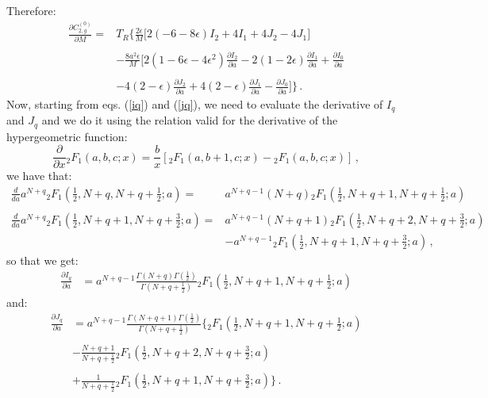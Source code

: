 \documentclass[10pt,a4paper]{article}
\begin{document}
Therefore:
\begin{equation}
\begin{array}{rl}
\displaystyle \frac{\partial C_{2,g}^{(0)}}{\partial M}=&\displaystyle T_R\Bigg\{\frac{2\epsilon}M\Big[2(-6-8\epsilon)I_2+4I_1+4J_2-4J_1\Big]\\
\\
&\displaystyle -\frac{8a^2\epsilon}{M}\Bigg[2(1-6\epsilon-4\epsilon^2)\frac{\partial I_2}{\partial a}-2(1-2\epsilon)\frac{\partial I_1}{\partial a}+\frac{\partial I_0}{\partial a}\\
\\
& \displaystyle -4(2-\epsilon)\frac{\partial J_2}{\partial a}+4(2-\epsilon)\frac{\partial J_1}{\partial a}-\frac{\partial J_0}{\partial a}\Bigg]\Bigg\}\,.
\end{array}
\end{equation}
Now, starting from eqs. (\ref{iq}) and (\ref{jq}), we need to evaluate the derivative of $I_q$ and $J_q$ and we do it using the relation valid for the derivative of the hypergeometric function:
\begin{equation}
\frac{\partial}{\partial x} {_2F_1}(a,b,c;x) = \frac{b}{x}\left[ {_2F_1}(a,b+1,c;x) - {_2F_1}(a,b,c;x)\right]\,,
\end{equation}
we have that:
\begin{equation}
\begin{array}{ll}
\displaystyle \frac{d}{da} a^{N+q} {_2F_1}\left(\frac12,N+q,N+q+\frac12;a\right) = &\displaystyle a^{N+q-1}(N+q) {_2F_1}\left(\frac12,N+q+1,N+q+\frac12;a\right)\\
\\
\displaystyle \frac{d}{da} a^{N+q} {_2F_1}\left(\frac12,N+q+1,N+q+\frac32;a\right) = &\displaystyle a^{N+q-1}(N+q+1) {_2F_1}\left(\frac12,N+q+2,N+q+\frac32;a\right)\\
&\displaystyle -a^{N+q-1}{_2F_1}\left(\frac12,N+q+1,N+q+\frac32;a\right)\,,
\end{array}
\end{equation}
so that we get:
\begin{equation}
\begin{array}{rl}
\displaystyle \frac{\partial I_q}{\partial a} &\displaystyle = a^{N+q-1}\frac{\Gamma(N+q)\Gamma(\frac12)}{\Gamma(N+q+\frac12)}{_2F_1}\left(\frac12,N+q+1,N+q+\frac12;a\right)
\end{array}
\label{diq}
\end{equation}
and:
\begin{equation}
\begin{array}{rl}
\displaystyle \frac{\partial J_q}{\partial a} &\displaystyle =  a^{N+q-1}\frac{\Gamma(N+q+1)\Gamma(\frac12)}{\Gamma(N+q+\frac12)}\bigg\{{_2F_1}\left(\frac12,N+q+1,N+q+\frac12;a\right)\\
\\
&\displaystyle - \frac{N+q+1}{N+q+\frac12}{_2F_1}\left(\frac12,N+q+2,N+q+\frac32;a\right)\\
\\
&\displaystyle +\frac1{N+q+\frac12}{_2F_1}\left(\frac12,N+q+1,N+q+\frac32;a\right)\bigg\}\,.
\end{array}
\label{djq}
\end{equation}
\end{document}
